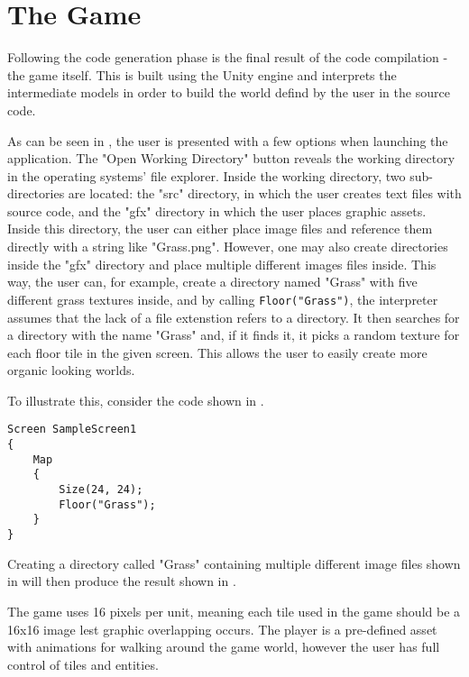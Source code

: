 \section{The Game}
Following the code generation phase is the final result of the code compilation - the game itself. 
This is built using the Unity engine and interprets the intermediate models in order to build the world defind by the user in the \dazel{} source code.


As can be seen in , the user is presented with a few options when launching the application. 
The "Open Working Directory" button reveals the working directory in the operating systems' file explorer.
Inside the working directory, two sub-directories are located: the "src" directory, in which the user creates text files with source code, and the "gfx" directory in which the user places graphic assets. Inside this directory, the user can either place image files and reference them directly with a string like "Grass.png". However, one may also create directories inside the "gfx" directory and place multiple different images files inside. This way, the user can, for example, create a directory named "Grass" with five different grass textures inside, and by calling \texttt{Floor("Grass")}, the interpreter assumes that the lack of a file extenstion refers to a directory. It then searches for a directory with the name "Grass" and, if it finds it, it picks a random texture for each floor tile in the given screen. This allows the user to easily create more organic looking worlds. 


To illustrate this, consider the \dazel{} code shown in .
\begin{lstlisting}[caption={}, label={lst:DazelGrassExample},escapechar=|]
Screen SampleScreen1 
{
	Map 
	{
		Size(24, 24);
		Floor("Grass");
	}
}
\end{lstlisting}

Creating a directory called "Grass" containing multiple different image files shown in  will then produce the result shown in .



The game uses 16 pixels per unit, meaning each tile used in the game should be a 16x16 image lest graphic overlapping occurs. 
The player is a pre-defined asset with animations for walking around the game world, however the user has full control of tiles and entities.